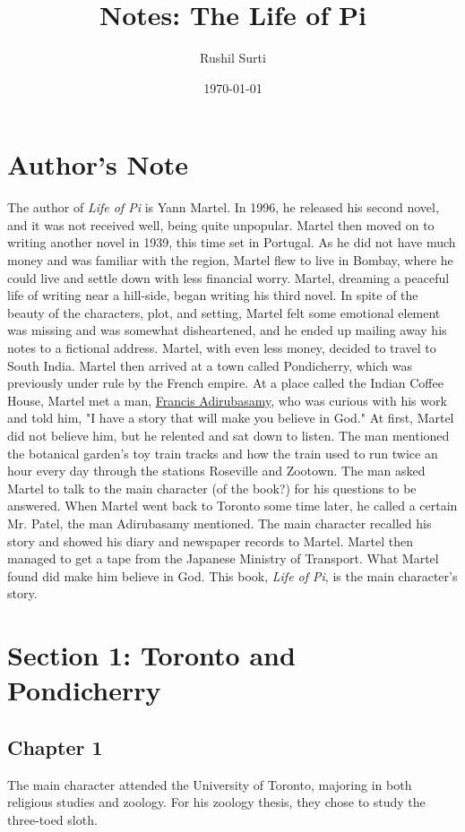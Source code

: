 \documentclass[11pt]{article}
\author{Rushil Surti}
\date{\today}
\title{Notes: The Life of Pi}
\begin{document}
\maketitle
\tableofcontents

\newpage

\section{Author's Note}
\label{sec:org800bf18}
The author of \emph{Life of Pi} is Yann Martel. In 1996, he released his second novel, and it was not received well, being quite unpopular. Martel then moved on to writing another novel in 1939, this time set in Portugal. As he did not have much money and was familiar with the region, Martel flew to live in Bombay, where he could live and settle down with less financial worry. Martel, dreaming a peaceful life of writing near a hill-side, began writing his third novel. In spite of the beauty of the characters, plot, and setting, Martel felt some emotional element was missing and was somewhat disheartened, and he ended up mailing away his notes to a fictional address. Martel, with even less money, decided to travel to South India. Martel then arrived at a town called Pondicherry, which was previously under rule by the French empire. At a place called the Indian Coffee House, Martel met a man, \uline{Francis Adirubasamy}, who was curious with his work and told him, "I have a story that will make you believe in God." At first, Martel did not believe him, but he relented and sat down to listen. The man mentioned the botanical garden's toy train tracks and how the train used to run twice an hour every day through the stations Roseville and Zootown. The man asked Martel to talk to the main character (of the book?) for his questions to be answered. When Martel went back to Toronto some time later, he called a certain Mr. Patel, the man Adirubasamy mentioned. The main character recalled his story and showed his diary and newspaper records to Martel. Martel then managed to get a tape from the Japanese Ministry of Transport. What Martel found did make him believe in God. This book, \emph{Life of Pi}, is the main character's story.
\section{Section 1: Toronto and Pondicherry}
\label{sec:org6bff5b4}
\subsection{Chapter 1}
\label{sec:org2861d00}
The main character attended the University of Toronto, majoring in both religious studies and zoology. For his zoology thesis, they chose to study the three-toed sloth.
\end{document}
